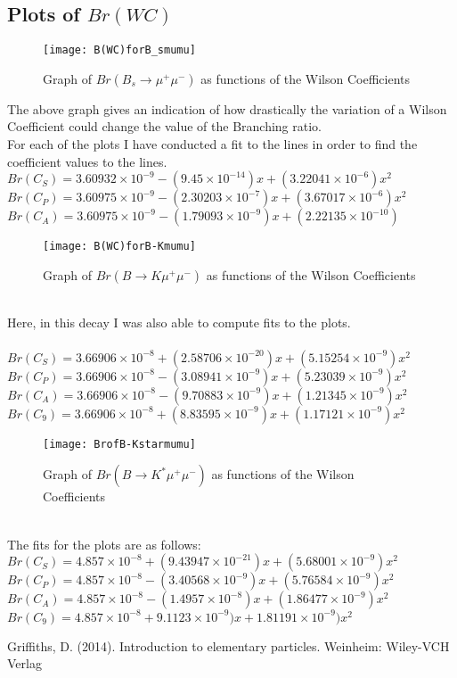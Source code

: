 \documentclass[12pt]{article}
\begin{document}
\begin{enumerate}
\section{Plots of $Br(WC)$}
\begin{figure}[h]
\centering
\texttt{[image: B(WC)forB\_smumu]}
\caption{Graph of $Br(B_s\rightarrow \mu^+\mu^-)$ as functions of the Wilson Coefficients}
\end{figure}
The above graph gives an indication of how drastically the variation of a Wilson Coefficient could change the value of the Branching ratio.\\
For each of the plots I have conducted a fit to the lines in order to find the coefficient values to the lines. \\
$Br(C_S)=3.60932\times10^{-9} - (9.45\times10^{-14}) x + (3.22041\times10^{-6})x^2$\\
$Br(C_P)=3.60975\times10^{-9} - (2.30203\times10^{-7})x + (3.67017\times10^{-6}) x^2$\\
$Br(C_A)=3.60975\times10^{-9} - (1.79093\times10^{-9})x + (2.22135\times10^{-10})$\\
\begin{figure}[h]
\centering
\texttt{[image: B(WC)forB-Kmumu]}
\caption{Graph of $Br(B\rightarrow K\mu^+\mu^-)$ as functions of the Wilson Coefficients}
\end{figure}\\
Here, in this decay I was also able to compute fits to the plots.\\
\\
$Br(C_S)=3.66906\times10^{-8} + (2.58706\times10^{-20})x + (5.15254\times10^{-9})x^2$\\
$Br(C_P)=3.66906\times10^{-8} - (3.08941\times10^{-9})x + (5.23039\times10^{-9})x^2$\\
$Br(C_A)=3.66906\times10^{-8} - (9.70883\times10^{-9}) x + (1.21345\times10^{-9}) x^2$\\
$Br(C_9)=3.66906\times10^{-8} + (8.83595\times10^{-9})x + (1.17121\times10^{-9}) x^2$\\
\begin{figure}[h]
\centering
\texttt{[image: BrofB-Kstarmumu]}
\caption{Graph of $Br(B\rightarrow K^*\mu^+\mu^-)$ as functions of the Wilson Coefficients}
\end{figure}\\
The fits for the plots are as follows:\\
$Br(C_S)=4.857\times10^{-8} + (9.43947\times10^{-21})x + (5.68001\times10^{-9}) x^2$\\
$Br(C_P)=4.857\times10^{-8} - (3.40568\times10^{-9})x + (5.76584\times10^{-9}) x^2$\\
$Br(C_A)=4.857\times10^{-8} - (1.4957\times10^{-8})x + (1.86477\times10^{-9}) x^2$\\
$Br(C_9)=4.857\times10^{-8} + 9.1123\times10^{-9})x + 1.81191\times10^{-9}) x^2$\\
\newpage
\begin{thebibliography}{9}
Griffiths, D. (2014). Introduction to elementary particles. Weinheim: Wiley-VCH Verlag


\end{thebibliography}
\end{enumerate}
\end{document}

